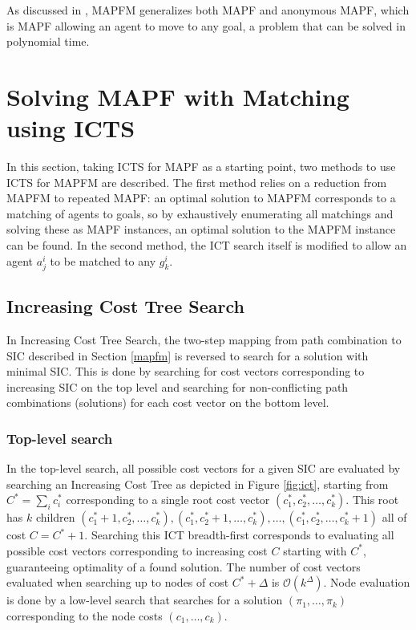 \documentclass[english]{article}
\begin{document}
	As discussed in \cite{ma2016}, MAPFM generalizes both MAPF and anonymous MAPF, which is MAPF allowing an agent to move to any goal, a problem that can be solved in polynomial time.
	\section{Solving MAPF with Matching using ICTS} %
	\label{section:icts-matching}
	In this section, taking ICTS for MAPF as a starting point, two methods to use ICTS for MAPFM are described. The first method relies on a reduction from MAPFM to repeated MAPF: an optimal solution to MAPFM corresponds to a matching of agents to goals, so by exhaustively enumerating all matchings and solving these as MAPF instances, an optimal solution to the MAPFM instance can be found. In the second method, the ICT search itself is modified to allow an agent $a_j^i$ to be matched to any $g_k^i$.
	\subsection{Increasing Cost Tree Search}
	\label{icts}
	In Increasing Cost Tree Search\cite{sharon2011}, the two-step mapping from path combination to SIC described in Section \ref{mapfm} is reversed to search for a solution with minimal SIC. This is done by searching for cost vectors corresponding to increasing SIC on the top level and searching for non-conflicting path combinations (solutions) for each cost vector on the bottom level. 
	
	\subsubsection{Top-level search}
	In the top-level search, all possible cost vectors for a given SIC are evaluated by searching an Increasing Cost Tree as depicted in Figure \ref{fig:ict}, starting from $C^* = \sum_i c^*_i$ corresponding to a single root cost vector $(c^*_1,c^*_2,\ldots,c^*_k)$. This root has $k$ children $(c^*_1 + 1,c^*_2,\ldots,c^*_k),(c^*_1,c^*_2 + 1,\ldots,c^*_k),\ldots,(c^*_1,c^*_2,\ldots,c^*_k + 1)$ all of cost $C = C^* + 1$. Searching this ICT breadth-first corresponds to evaluating all possible cost vectors corresponding to increasing cost $C$ starting with $C^*$, guaranteeing optimality of a found solution. The number of cost vectors evaluated when searching up to nodes of cost $C^* + \Delta$ is $\mathcal{O}(k^\Delta)$. Node evaluation is done by a low-level search that searches for a solution $(\pi_1,\ldots,\pi_k)$ corresponding to the node costs $(c_1,\ldots,c_k)$.
	
\end{document}

